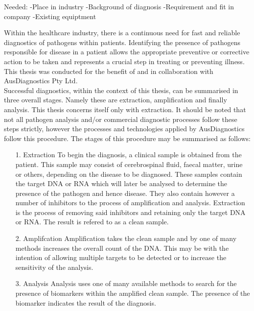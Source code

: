 Needed:
-Place in industry
-Background of diagnosis
-Requirement and fit in company
-Existing equiptment

Within the healthcare industry, there is a continuous need for fast and reliable diagnostics of pathogens within patients. Identifying the presence of pathogens responsible for disease in a patient allows the appropriate preventive or corrective action to be taken and represents a crucial step in treating or preventing illness. This thesis was conducted for the benefit of and in collaboration with AusDiagnostics Pty Ltd.\\

Successful diagnostics, within the context of this thesis, can be summarised in three overall stages. Namely these are extraction, amplification and finally analysis. This thesis concerns itself only with extraction. It should be noted that not all pathogen analysis and/or commercial diagnostic processes follow these steps strictly, however the processes and technologies applied by AusDiagnostics follow this procedure. The stages of this procedure may be summarised as follows:
\begin{enumerate}
	\item [1. Extraction] To begin the diagnosis, a clinical sample is obtained from the patient. This sample may consist of cerebrospinal fluid, faecal matter, urine or others, depending on the disease to be diagnosed. These samples contain the target DNA or RNA which will later be analysed to determine the presence of the pathogen and hence disease. They also contain however a number of inhibitors to the process of amplification and analysis. Extraction is the process of removing said inhibitors and retaining only the target DNA or RNA. The result is refered to as a clean sample.
	\item  [2. Amplifcation] Amplification takes the clean sample and by one of many methods increases the overall count of the DNA. This may be with the intention of allowing multiple targets to be detected or to increase the sensitivity of the analysis.
	\item[3. Analysis] Analysis uses one of many available methods to search for the presence of biomarkers within the amplified clean sample. The presence of the biomarker indicates the result of the diagnosis.
\end{enumerate}

